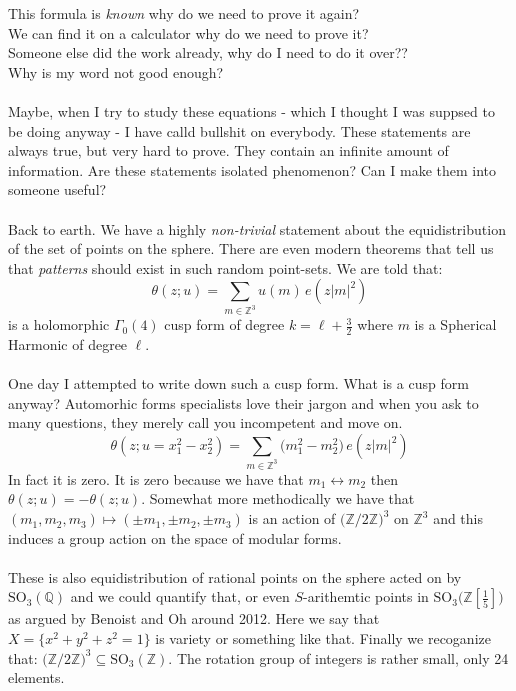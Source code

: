 \documentclass[12pt]{article}
\begin{document}
This formula is \textit{known} why do we need to prove it again? \\
We can find it on a calculator why do we need to prove it? \\
Someone else did the work already, why do I need to do it over?? \\
Why is my word not good enough? \\ \\
Maybe, when I try to study these equations - which I thought I was suppsed to be doing anyway - I have calld bullshit on everybody.  These statements are always true, but very hard to prove.  They contain an infinite amount of information. Are these statements isolated phenomenon?  Can I make them into someone useful? \\ \\
Back to earth.  We have a highly \textit{non-trivial} statement about the equidistribution of the set of points on the sphere.  There are even modern theorems that tell us that \textit{patterns} should exist in such random point-sets.  We are told that:
$$ \theta(z;u) = \sum_{m \in \mathbb{Z}^3} u(m) \, e(z|m|^2) $$
is a holomorphic $\Gamma_0(4)$ cusp form of degree $k = \ell + \frac{3}{2}$ where $m$ is a Spherical Harmonic of degree $\ell$. \\ \\
One day I attempted to write down such a cusp form.  What is a cusp form anyway? Automorhic forms specialists love their jargon and when you ask to many questions, they merely call you incompetent and move on.
$$ \theta(z; u = x_1^2 - x_2^2) = \sum_{m \in \mathbb{Z}^3} \big( m_1^2 - m_2^2 \big) \, e(z|m|^2) $$
In fact it is zero.  It is zero because we have that $m_1 \leftrightarrow m_2$ then $\theta(z;u) = - \theta(z;u)$.  Somewhat more methodically we have that $(m_1,m_2, m_3) \mapsto (\pm m_1, \pm m_2, \pm m_3)$ is an action of $\big(\mathbb{Z}/2\mathbb{Z}\big)^3$ on $\mathbb{Z}^3$ and this induces a group action on the space of modular forms. \\ \\
These is also equidistribution of rational points on the sphere acted on by $\text{SO}_3(\mathbb{Q})$ and we could quantify that, or even $S$-arithemtic points in $\text{SO}_3\big(\mathbb{Z}[\frac{1}{5}]\big)$ as argued by Benoist and Oh around 2012.  Here we say that $X = \{ x^2 + y^2 + z^2 = 1\}$ is variety or something like that.  Finally we recoganize that: $\big(\mathbb{Z}/2\mathbb{Z}\big)^3 \subseteq \text{SO}_3(\mathbb{Z})$.  The rotation group of integers is rather small, only 24 elements. \\ \\
\end{document}
